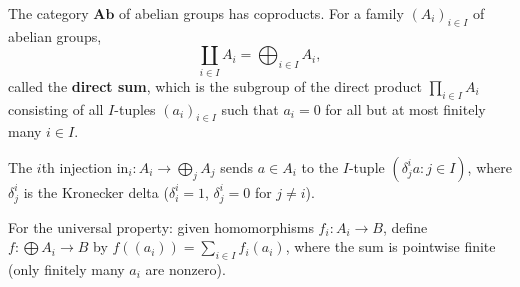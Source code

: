 The category $\mathbf{Ab}$ of abelian groups has coproducts. For a family $(A_i)_{i \in I}$ of abelian groups,
$$\coprod_{i \in I} A_i = \bigoplus_{i \in I} A_i,$$
called the \textbf{direct sum}, which is the subgroup of the direct product $\prod_{i \in I} A_i$ consisting of all $I$-tuples $(a_i)_{i \in I}$ such that $a_i = 0$ for all but at most finitely many $i \in I$.

The $i$th injection $\text{in}_i: A_i \to \bigoplus_j A_j$ sends $a \in A_i$ to the $I$-tuple $(\delta^i_j a : j \in I)$, where $\delta^i_j$ is the Kronecker delta ($\delta^i_i = 1$, $\delta^i_j = 0$ for $j \neq i$).

For the universal property: given homomorphisms $f_i: A_i \to B$, define $f: \bigoplus A_i \to B$ by $f((a_i)) = \sum_{i \in I} f_i(a_i)$, where the sum is pointwise finite (only finitely many $a_i$ are nonzero).
